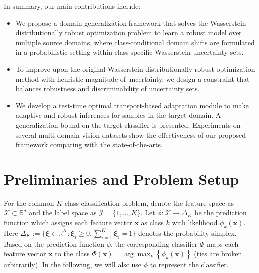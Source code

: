 \documentclass[journal]{IEEEtran}
\begin{document}
In summary, our main contributions include:
\begin{itemize}
    \item We propose a  domain generalization framework that solves the Wasserstein distributionally robust optimization problem to learn a robust model over multiple source domains, where class-conditional domain shifts are formulated in a probabilistic setting within class-specific Wasserstein uncertainty sets. %
    \item To improve upon the original Wasserstein distributionally robust optimization method with heuristic magnitude of uncertainty, we design a constraint that balances robustness and discriminability of uncertainty sets.
    \item 
    We develop a test-time optimal transport-based  adaptation module to make adaptive and robust inferences for samples in the target domain.
    A generalization bound on the target classifier is presented. Experiments on several multi-domain vision datasets show the effectiveness of our proposed framework comparing with the state-of-the-arts.
\end{itemize}




\section{Preliminaries and Problem Setup}
For the common $K$-class classification problem, denote the feature space as $\mathcal{X}\subset \mathbb{R}^d$ and the label space as
{$\mathcal{Y}=\{1,\ldots,K\}$}. 
Let $\phi:\mathcal{X}\rightarrow \Delta_K$ be the prediction function which assigns each feature vector $\boldsymbol{x}$ as class $k$ with likelihood $\phi_k(\boldsymbol{x})$. Here $\Delta_K:=\{\boldsymbol{\xi}\in\mathbb{R}^K:\boldsymbol{\xi}_i\geq0,\sum_{i=1}^K\boldsymbol{\xi}_i=1\}$ denotes the probability simplex. Based on the prediction function $\phi$, the corresponding classifier $\Phi$ maps each feature vector $\boldsymbol{x}$ to the class $\Phi(\boldsymbol{x})=\arg\max_k\left\{\phi_k(\boldsymbol{x})\right\}$ (ties are broken arbitrarily). In the following, we will also use $\phi$ to represent the classifier.
\end{document}
